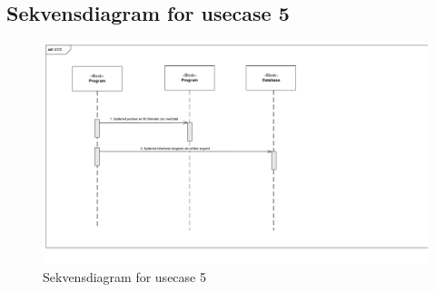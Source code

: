 \subsection{Sekvensdiagram for usecase 5} 
\begin{figure}[H]
	\centering
	\includegraphics[width=1\textwidth]{pdf/UC5_cropped}
	\caption{Sekvensdiagram for usecase 5}
	\label{fig:uc1}
\end{figure}
